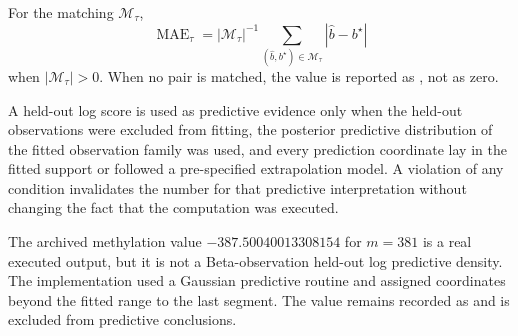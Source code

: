 \begin{definition}
\label{def:matched-mae-paper}
For the matching $\mathcal M_\tau$,
\[
\operatorname{MAE}_\tau
=|\mathcal M_\tau|^{-1}
 \sum_{(\widehat b,b^\star)\in\mathcal M_\tau}|\widehat b-b^\star|
\]
when $|\mathcal M_\tau|>0$. When no pair is matched, the value is reported as \NA, not as zero.
\end{definition}

\begin{definition}
\label{def:heldout-score-paper}
A held-out log score is used as predictive evidence only when the held-out observations were excluded from fitting, the posterior predictive distribution of the fitted observation family was used, and every prediction coordinate lay in the fitted support or followed a pre-specified extrapolation model. A violation of any condition invalidates the number for that predictive interpretation without changing the fact that the computation was executed.
\end{definition}

\begin{exclusionbox}
The archived methylation value $-387.50040013308154$ for $m=381$ is a real executed output, but it is not a Beta-observation held-out log predictive density. The implementation used a Gaussian predictive routine and assigned coordinates beyond the fitted range to the last segment. The value remains recorded as  and is excluded from predictive conclusions.
\end{exclusionbox}
